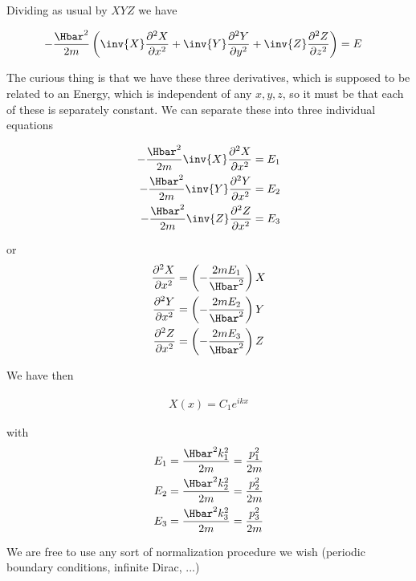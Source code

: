 Dividing as usual by \(XYZ\) we have

\begin{equation}\label{eqn:lecture5BigReviewCh4FreeParticle:120}
\begin{aligned}
-\frac{\Hbar^2}{2m} \left(
\inv{X} \frac{\partial^2 X}{\partial {x}^2}
+ \inv{Y} \frac{\partial^2 Y}{\partial {y}^2}
+ \inv{Z} \frac{\partial^2 Z}{\partial {z}^2} \right)
&= E
\end{aligned}
\end{equation}

The curious thing is that we have these three derivatives, which is supposed to be related to an Energy, which is independent of any \(x,y,z\), so it must be that each of these is separately constant.  We can separate these into three individual equations

\begin{equation}\label{eqn:lecture5BigReviewCh4FreeParticle:140}
\begin{aligned}
-\frac{\Hbar^2}{2m} \inv{X} \frac{\partial^2 X}{\partial {x}^2} &= E_1 \\
-\frac{\Hbar^2}{2m} \inv{Y} \frac{\partial^2 Y}{\partial {x}^2} &= E_2 \\
-\frac{\Hbar^2}{2m} \inv{Z} \frac{\partial^2 Z}{\partial {x}^2} &= E_3
\end{aligned}
\end{equation}

or
\begin{equation}\label{eqn:lecture5BigReviewCh4FreeParticle:160}
\begin{aligned}
\frac{\partial^2 X}{\partial {x}^2} &= \left( - \frac{2m E_1}{\Hbar^2} \right) X  \\
\frac{\partial^2 Y}{\partial {x}^2} &= \left( - \frac{2m E_2}{\Hbar^2} \right) Y  \\
\frac{\partial^2 Z}{\partial {x}^2} &= \left( - \frac{2m E_3}{\Hbar^2} \right) Z
\end{aligned}
\end{equation}

We have then

\begin{equation}\label{eqn:lecture5BigReviewCh4FreeParticle:180}
\begin{aligned}
X(x) = C_1 e^{i k x}
\end{aligned}
\end{equation}

with
\begin{equation}\label{eqn:lecture5BigReviewCh4FreeParticle:200}
\begin{aligned}
E_1 &= \frac{\Hbar^2 k_1^2 }{2m} = \frac{p_1^2}{2m} \\
E_2 &= \frac{\Hbar^2 k_2^2 }{2m} = \frac{p_2^2}{2m} \\
E_3 &= \frac{\Hbar^2 k_3^2 }{2m} = \frac{p_3^2}{2m}
\end{aligned}
\end{equation}

We are free to use any sort of normalization procedure we wish (periodic boundary conditions, infinite Dirac, ...)


